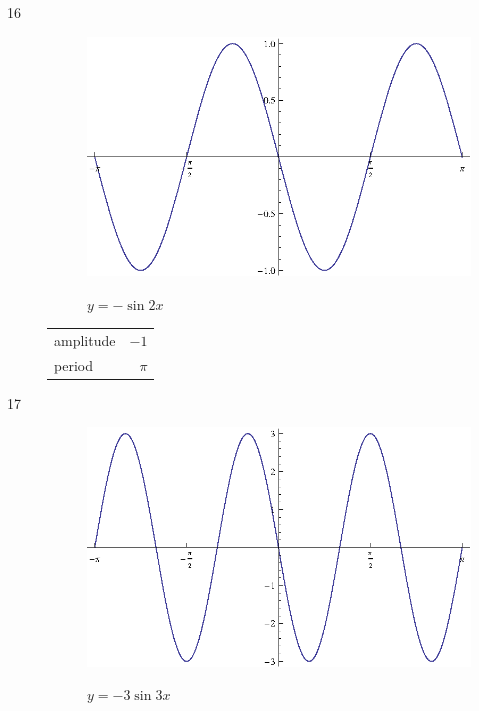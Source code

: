 \documentclass{exam}
\begin{document}
\begin{description}
      \item[16]
        \begin{figure}[H]
          \centering
          \includegraphics[scale=0.9]{exercise16.eps}

          $y = - \sin 2x$
        \end{figure}

        \begin{tabular}[H]{lr}
          \toprule
          amplitude & $-1$ \\
          period    & $\pi$ \\
          \bottomrule
        \end{tabular}

      \item[17]
        \begin{figure}[H]
          \centering
          \includegraphics[scale=0.9]{exercise17.eps}

          $y = - 3 \sin 3x$
        \end{figure}


\end{description}
\end{document}
